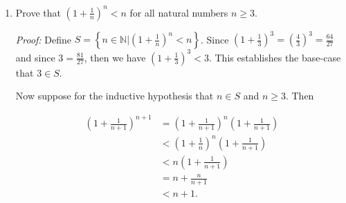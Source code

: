 \documentclass[12pt]{article}
\begin{document}
{\begin{enumerate}
Hence this is divisible by 7 and so $1\in S$.

Now suppose for the inductive hypothesis that $n\in \mathbb{N}$ and $n\in S$.  Since $n\in S$ we can infer that there is some $k\in \mathbb{Z}$ such that $3^{4n+1} - 5^{2n-1} = 7k$.  Hence

\begin{align*}
  3^{4(n+1)+1}-5^{2(n+1)-1} &= 3^{4n+5} - 5^{2n+1} \\[.3cm]
  &= 3^4\cdot 3^{4n+1}-5^2\cdot 5^{2n-1} \\[.3cm]
  &= (77+4)3^{4n+1} + (21+4)5^{2n-1} \\[.3cm]
  &= 77\cdot 3^{4n+1}-21\cdot 5^{2n-1}+4(3^{4n+1}-5^{2n-1}) \\[.3cm]
  &= 7(11\cdot 3^{4n+1}-3\cdot 5^{2n-1})+4\cdot 7k \\[.3cm]
  &= 7(11\cdot 3^{4n+1}-3\cdot 5^{2n-1}+28). \\
\end{align*}

Therefore $3^{4(n+1)+1}-5^{2(n+1)-1} = 3^{4n+5} - 5^{2n+1}$ is divisible by 7, which is the condition for $n+1\in S$.  So by the Principle of Mathematical Induction we have $S=\mathbb{N}$, which is to say that for every $n\in\mathbb{N}$ we have that $3^{4n+1}-5^{2n-1}$ is divisible by 7. \qed

\item Prove that $\displaystyle \left(1 + \frac{1}{n}\right)^n < n$ for all natural numbers $n \geq 3$.

{\it Proof:} Define $S=\left\{n\in\mathbb{N}|\left(1+\frac 1 n\right)^n<n\right\}$.  Since $\left(1+\frac 1 3\right)^3 = \left(\frac{4}{3}\right)^3 = \frac{64}{27}$ and since $3 = \frac{81}{27}$, then we have $(1+\frac 1 3)^3 < 3$.  This establishes the base-case that $3\in S$.

Now suppose for the inductive hypothesis that $n\in S$ and $n\geq 3$.  Then

\begin{align*}
  \left(1+\frac 1 {n+1}\right)^{n+1} & = \left(1+\frac 1 {n+1}\right)^{n}\left(1+\frac 1 {n+1}\right) \\[.3cm]
  &< \left(1+\frac 1 {n}\right)^{n} \left(1+\frac 1 {n+1}\right) \\[.3cm]
  &< n\left(1+\frac{1}{n+1}\right) \\[.3cm]
  &= n+\frac{n}{n+1} \\[.3cm]
  &< n+1.\\
\end{align*}


\end{enumerate}}
\end{document}
